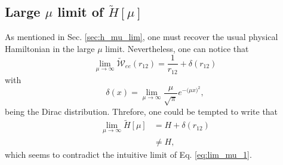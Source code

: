 \documentclass[aip,jcp,reprint,noshowkeys,superscriptaddress,twocolumn]{revtex4-1}
\begin{document}
\subsection{Large $\mu$ limit of $\tilde{H}[\mu]$}
\label{sec:large_mu_lim}
As mentioned in Sec. \ref{sec:h_mu_lim}, one must recover the usual physical Hamiltonian in the large $\mu$ limit. 
Nevertheless, one can notice that 
\begin{equation}
 \label{eq:lim_mu_3}
 \lim_{\mu \rightarrow \infty} \tilde{\mathcal{W}}_{ee}(r_{12})  = \frac{1}{r_{12}} + \delta(r_{12}) 
\end{equation}
with 
\begin{equation}
 \delta(x) = \lim_{\mu \rightarrow \infty} \frac{\mu}{\sqrt{\pi}} e^{-\big(\mu x \big)^2}, 
\end{equation}
being the Dirac distribution. Threfore, one could be tempted to write that 
\begin{equation}
 \begin{aligned}
 \label{eq:lim_mu_4}
 \lim_{\mu \rightarrow \infty} \tilde{H}[\mu]& = H + \delta(r_{12})  \\
                                             & \ne H,
 \end{aligned}
\end{equation}
which seems to contradict the intuitive limit of Eq. \eqref{eq:lim_mu_1}. 
\end{document}
